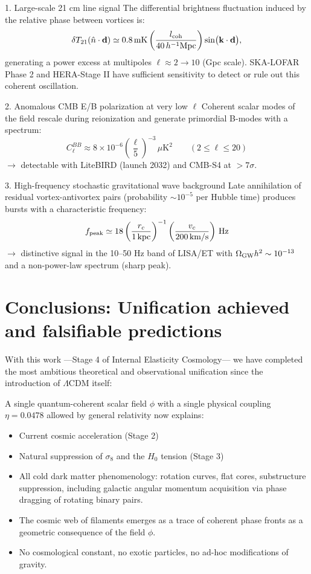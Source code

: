 \documentclass[11pt,a4paper]{article}
\begin{document}
1. Large-scale 21 cm line signal  
The differential brightness fluctuation induced by the relative phase between vortices is:
\begin{equation}
	\delta T_{21}(\hat{n} \cdot \mathbf{d}) 
	\simeq 0.8\,\text{mK} \left(\frac{l_{\rm coh}}{40\,h^{-1}\text{Mpc}}\right) \sin\!\big(\mathbf{k}\cdot\mathbf{d}\big),
\end{equation}
generating a power excess at multipoles $\ell \approx 2\to10$ (Gpc scale). SKA-LOFAR Phase 2 and HERA-Stage II have sufficient sensitivity to detect or rule out this coherent oscillation.

2. Anomalous CMB E/B polarization at very low $\ell$  
Coherent scalar modes of the field rescale during reionization and generate primordial B-modes with a spectrum:
\begin{equation}
	C_\ell^{BB} \approx 8 \times 10^{-6} \left(\frac{\ell}{5}\right)^{-3} \, \mu\text{K}^2 \qquad (2 \leq \ell \leq 20)
\end{equation}
$\rightarrow$ detectable with LiteBIRD (launch 2032) and CMB-S4 at $>7\sigma$.

3. High-frequency stochastic gravitational wave background  
Late annihilation of residual vortex-antivortex pairs (probability $\sim 10^{-5}$ per Hubble time) produces bursts with a characteristic frequency:
\begin{equation}
	f_{\rm peak} \simeq 18 \left(\frac{r_c}{1\,\text{kpc}}\right)^{-1} \left(\frac{v_c}{200\,\text{km/s}}\right) \, \text{Hz}
\end{equation}
$\rightarrow$ distinctive signal in the 10–50 Hz band of LISA/ET with $\Omega_{\rm GW}h^2 \sim 10^{-13}$ and a non-power-law spectrum (sharp peak).

\section{Conclusions: Unification achieved and falsifiable predictions}

With this work —Stage 4 of Internal Elasticity Cosmology— we have completed the most ambitious theoretical and observational unification since the introduction of $\Lambda$CDM itself:

A single quantum-coherent scalar field $\phi$ with a single physical coupling $\eta = 0.0478$ allowed by general relativity now explains:
\begin{itemize}
	\item Current cosmic acceleration (Stage 2)
	\item Natural suppression of $\sigma_8$ and the $H_0$ tension (Stage 3)
	\item All cold dark matter phenomenology: rotation curves, flat cores, substructure suppression, including galactic angular momentum acquisition via phase dragging of rotating binary pairs.
	\item The cosmic web of filaments emerges as a trace of coherent phase fronts as a geometric consequence of the field $\phi$.
	\item No cosmological constant, no exotic particles, no ad-hoc modifications of gravity.
\end{itemize}
\end{document}
